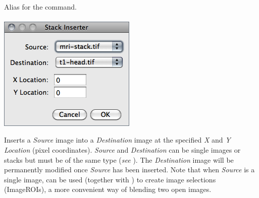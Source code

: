 

\paragraph{\protect{}\label{sub:Reverse}}

Alias for the 
command.


\paragraph[\protect\userinterface{Insert\ldots{}}]{\protect{}\label{par:Insert...}\improvement{}}

\begin{minipage}[c][1\totalheight][t]{0.365\columnwidth}%
\includegraphics[scale=0.55]{images/StackInserter}%
\end{minipage}%
\begin{minipage}[c][1\totalheight][t]{0.635\columnwidth}%
Inserts a \emph{Source} image into a \emph{Destination} image at the
specified \emph{X} and \emph{Y} \emph{Location} (pixel coordinates).
\emph{Source }and \emph{Destination} can be single images or stacks
but must be of the same type (\emph{see} ).
The \emph{Destination} image will be permanently modified once \emph{Source}
has been inserted. Note that when \emph{Source} is a single image,
can be used (together with )
to create image selections (ImageROIs), a more convenient way of blending
two open images.%
\end{minipage}




